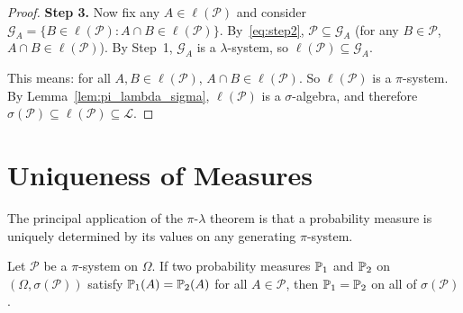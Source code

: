 \documentclass[11pt,a4paper]{article}
\begin{document}
\begin{proof}
\textbf{Step 3.} Now fix any $A \in \ell(\mathcal{P})$ and consider
$\mathcal{G}_A = \{B \in \ell(\mathcal{P}) :
A \cap B \in \ell(\mathcal{P})\}$. By~\eqref{eq:step2},
$\mathcal{P} \subseteq \mathcal{G}_A$ (for any $B \in \mathcal{P}$,
$A \cap B \in \ell(\mathcal{P})$). By Step~1, $\mathcal{G}_A$ is a
$\lambda$-system, so $\ell(\mathcal{P}) \subseteq \mathcal{G}_A$.

This means: for all $A, B \in \ell(\mathcal{P})$,
$A \cap B \in \ell(\mathcal{P})$. So $\ell(\mathcal{P})$ is a
$\pi$-system. By Lemma~\ref{lem:pi_lambda_sigma},
$\ell(\mathcal{P})$ is a $\sigma$-algebra, and therefore
$\sigma(\mathcal{P}) \subseteq \ell(\mathcal{P}) \subseteq \mathcal{L}$.
\end{proof}


\section{Uniqueness of Measures}
\label{sec:uniqueness}

The principal application of the $\pi$-$\lambda$ theorem is that a
probability measure is uniquely determined by its values on any
generating $\pi$-system.

\begin{corollary}
\label{cor:uniqueness}
Let $\mathcal{P}$ be a $\pi$-system on $\Omega$. If two probability
measures $\mathbb{P}_1$ and $\mathbb{P}_2$ on
$(\Omega, \sigma(\mathcal{P}))$ satisfy
$\mathbb{P}_1(A) = \mathbb{P}_2(A)$ for all $A \in \mathcal{P}$, then
$\mathbb{P}_1 = \mathbb{P}_2$ on all of $\sigma(\mathcal{P})$.
\end{corollary}
\end{document}
